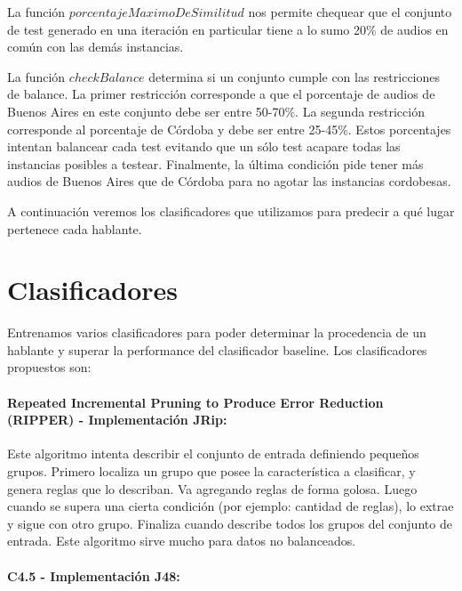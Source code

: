 La función $porcentajeMaximoDeSimilitud$ nos permite chequear que el conjunto de test generado en una iteración en particular tiene a lo sumo 20\% de audios en común con las demás instancias.

La función $checkBalance$ determina si un conjunto cumple con las restricciones de balance. La primer restricción corresponde a que el porcentaje de audios de Buenos Aires en este conjunto debe ser entre 50-70\%. La segunda restricción corresponde al porcentaje de Córdoba y debe ser entre 25-45\%. Estos porcentajes intentan balancear cada test evitando que un sólo test acapare todas las instancias posibles a testear. Finalmente, la última condición pide tener más audios de Buenos Aires que de Córdoba para no agotar las instancias cordobesas.

A continuación veremos los clasificadores que utilizamos para predecir a qué lugar pertenece cada hablante.

\section{Clasificadores}

Entrenamos varios clasificadores para poder determinar la procedencia de un hablante y superar la performance del clasificador baseline. Los clasificadores propuestos son: 

\paragraph{Repeated Incremental Pruning to Produce Error Reduction (RIPPER) \cite{Cohen1995} - Implementación JRip:}


Este algoritmo intenta describir el conjunto de entrada definiendo pequeños grupos. Primero localiza un grupo que posee la característica a clasificar, y genera reglas que lo describan. Va agregando reglas de forma golosa. Luego cuando se supera una cierta condición (por ejemplo: cantidad de reglas), lo extrae y sigue con otro grupo. Finaliza cuando describe todos los grupos del conjunto de entrada. Este algoritmo sirve mucho para datos no balanceados.

\paragraph{C4.5 \cite{Quinlan1993} - Implementación J48:}


